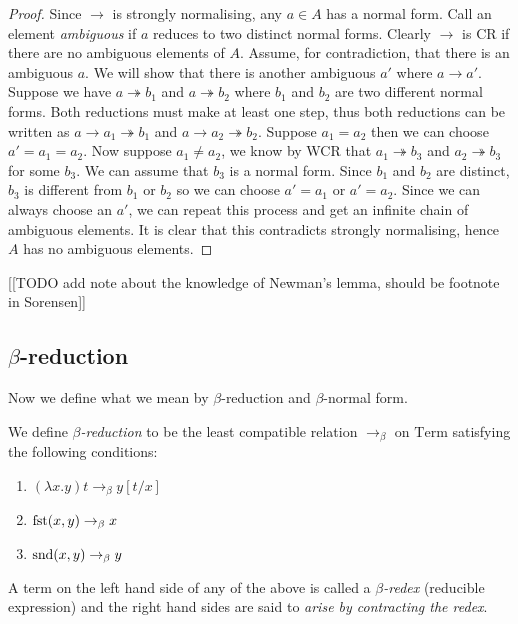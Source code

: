 \begin{proof}
    Since $\to$ is strongly normalising, any $a \in A$ has a normal form. Call an element \emph{ambiguous} if $a$ reduces to two distinct normal forms. Clearly $\to$ is CR if there are no ambiguous elements of $A$.
    Assume, for contradiction, that there is an ambiguous $a$. We will show that there is another ambiguous $a'$ where $a \to a'$.
    Suppose we have $a \twoheadrightarrow b_1$ and $a \twoheadrightarrow b_2$ where $b_1$ and $b_2$ are two different normal forms. Both reductions must make at least one step, thus both reductions can be written as $a \to a_1 \twoheadrightarrow b_1$ and $a \to a_2 \twoheadrightarrow b_2$.
    Suppose $a_1 = a_2$ then we can choose $a' = a_1 = a_2$. Now suppose $a_1 \neq a_2$, we know by WCR that $a_1 \twoheadrightarrow b_3$ and $a_2 \twoheadrightarrow b_3$ for some $b_3$. We can assume that $b_3$ is a normal form. Since $b_1$ and $b_2$ are distinct, $b_3$ is different from $b_1$ or $b_2$ so we can choose $a' = a_1$ or $a'=a_2$.
    Since we can always choose an $a'$, we can repeat this process and get an infinite chain of ambiguous elements. It is clear that this contradicts strongly normalising, hence $A$ has no ambiguous elements.
\end{proof}


[[TODO add note about the knowledge of Newman's lemma, should be footnote in Sorensen]]



\subsection{ \texorpdfstring{$\beta$}{}-reduction}

Now we define what we mean by $\beta$-reduction and $\beta$-normal form.

\begin{defin}\label{beta_reduction}
    We define \emph{$\beta$-reduction} to be the least compatible relation $\to_{\beta}$ on $\mathrm{Term}$ satisfying the following conditions:
    \begin{enumerate}
        \item $(\lambda x . y)t \to_{\beta} y [t / x]$
        \item $\mathrm{fst}(x,y) \to_{\beta} x$
        \item $\mathrm{snd}(x,y) \to_{\beta} y$
    \end{enumerate}
    A term on the left hand side of any of the above is called a \emph{$\beta$-redex} (reducible expression) and the right hand sides are said to \emph{arise by contracting the redex}.
\end{defin}

